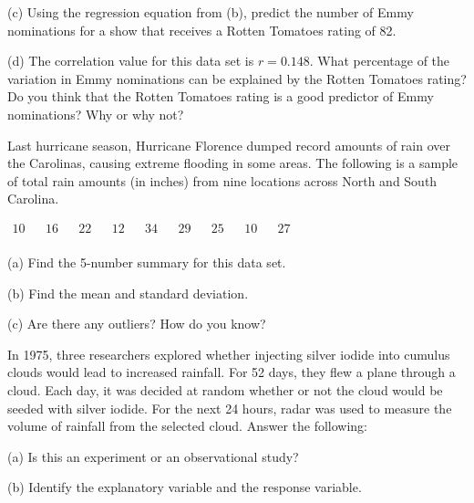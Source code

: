 \documentclass[12pt]{amsart}
\begin{document}
\begin{list}
\subitem(c) Using the regression equation from (b), predict the number of Emmy nominations for a show that receives a Rotten Tomatoes rating of 82.

\vspace{1in}

\subitem(d) The correlation value for this data set is $r=0.148$.  What percentage of the variation in Emmy nominations can be explained by the Rotten Tomatoes rating? Do you think that the Rotten Tomatoes rating is a good predictor of Emmy nominations? Why or why not?

\newpage

\item Last hurricane season, Hurricane Florence dumped record amounts of rain over the Carolinas, causing extreme flooding in some areas.  The following is a sample of total rain amounts (in inches) from nine locations across North and South Carolina.
\begin{center}
$\begin{array}{ccccccccccccccccc}
10 & & 16 & & 22 & & 12 & & 34 & & 29 & & 25 & & 10 & & 27\\
\end{array}$
\end{center}

\subitem(a) Find the 5-number summary for this data set.

\vspace{1in}

\subitem(b) Find the mean and standard deviation.

\vspace{1in}

\subitem(c) Are there any outliers? How do you know?

\vspace{1in}

\item In 1975, three researchers explored whether injecting silver iodide into cumulus clouds would lead to increased rainfall.  For 52 days, they flew a plane through a cloud.  Each day, it was decided at random whether or not the cloud would be seeded with silver iodide.  For the next 24 hours, radar was used to measure the volume of rainfall from the selected cloud.  Answer the following:

\subitem(a) Is this an experiment or an observational study?

\vspace{1in}

\subitem(b) Identify the explanatory variable and the response variable.


\end{list}
\end{document}
